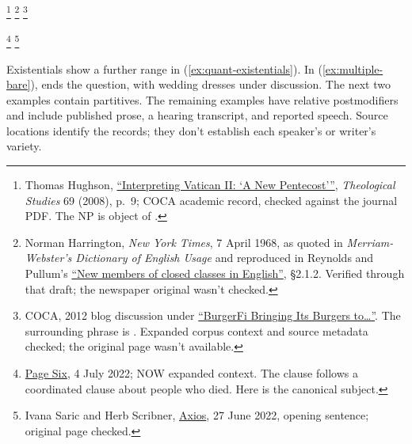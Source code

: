 \documentclass[12pt]{article}
\begin{document}
\ea\label{ex:quant-arguments}
\ea\label{ex:countless-part} \footnote{Thomas Hughson, \href{https://theologicalstudies.net/wp-content/uploads/2022/08/69.1.1.pdf\#page=7}{\enquote{Interpreting Vatican II: ‘A New Pentecost’}}, \textit{Theological Studies} 69 (2008), p.~9; COCA academic record, checked against the journal PDF. The NP is object of .}
\ex\label{ex:numerous-part} \footnote{Norman Harrington, \textit{New York Times}, 7 April 1968, as quoted in \textit{Merriam-Webster's Dictionary of English Usage} and reproduced in Reynolds and Pullum's \href{https://www.lel.ed.ac.uk/~gpullum/ClosedClasses.pdf}{\enquote{New members of closed classes in English}}, §2.1.2. Verified through that draft; the newspaper original wasn't checked.}
\ex\label{ex:multiple-part} \footnote{COCA, 2012 blog discussion under \href{http://www.tonetoatl.com/2012/08/burgerfi-bringing-its-burgers-to.html}{\enquote{BurgerFi Bringing Its Burgers to\ldots}}. The surrounding phrase is . Expanded corpus context and source metadata checked; the original page wasn't available.}
\begin{samepage}
\ex\label{ex:numerous-subj} \footnote{\href{https://pagesix.com/2022/07/04/travis-scott-performs-in-miami-at-e11even/}{Page Six}, 4 July 2022; NOW expanded context. The clause follows a coordinated clause about people who died. Here  is the canonical subject.}
\ex\label{ex:multiple-subj} \footnote{Ivana Saric and Herb Scribner, \href{https://www.axios.com/2022/06/27/amtrak-train-derail-missouri}{Axios}, 27 June 2022, opening sentence; original page checked.}
\end{samepage}
\z\z

Existentials show a further range in (\ref{ex:quant-existentials}). In (\ref{ex:multiple-bare}),  ends the question, with wedding dresses under discussion. The next two examples contain partitives. The remaining examples have relative postmodifiers and include published prose, a hearing transcript, and reported speech. Source locations identify the records; they don't establish each speaker's or writer's variety.
\end{document}
